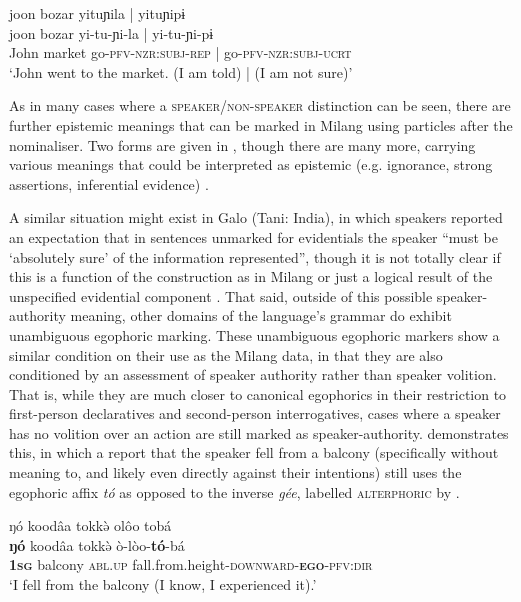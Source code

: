 \begin{exe}
        \ex \label{e:Description:MilangNonEgo}
        \glll joon bozar yituɲila | yituɲipɨ \\
        joon bozar yi-tu-ɲi-la | yi-tu-ɲi-pɨ \\
        John market go-\textsc{pfv}-\textsc{nzr:subj}-\textsc{rep} | go-\textsc{pfv}-\textsc{nzr:subj}-\textsc{ucrt} \\
        \glt `John went to the market. (I am told) | (I am not sure)' \\
        \cite[Milang,][457, given as two examples in source and combined here]{Modi2017}
\end{exe}
As in many cases where a \textsc{speaker}/\textsc{non-speaker} distinction can be seen, there are further epistemic meanings that can be marked in Milang using particles after the nominaliser. Two forms are given in , though there are many more, carrying various meanings that could be interpreted as epistemic (e.g. ignorance, strong assertions, inferential evidence) \cite[273]{Modi2017}.

A similar situation might exist in Galo (Tani: India), in which speakers reported an expectation that in sentences unmarked for evidentials the speaker ``must be `absolutely sure' of the information represented'', though it is not totally clear if this is a function of the construction as in Milang or just a logical result of the unspecified evidential component \cite[112]{Post2013}. That said, outside of this possible speaker-authority meaning, other domains of the language's grammar do exhibit unambiguous egophoric marking. These unambiguous egophoric markers show a similar condition on their use as the Milang data, in that they are also conditioned by an assessment of speaker authority rather than speaker volition. That is, while they are much closer to canonical egophorics in their restriction to first-person declaratives and second-person interrogatives, cases where a speaker has no volition over an action are still marked as speaker-authority.  demonstrates this, in which a report that the speaker fell from a balcony (specifically without meaning to, and likely even directly against their intentions) still uses the egophoric affix \textit{tó} as opposed to the inverse \textit{gée}, labelled \textsc{alterphoric} by .

\begin{exe}
        \ex \label{e:Description:GaloNonVolition}
        \glll ŋó koodâa tokkə̀ {olôo tobá} \\
        \textbf{ŋó} koodâa tokkə̀ ò-lòo-\textbf{tó}-bá \\
        \textbf{\textsc{1sg}} balcony \textsc{abl.up} fall.from.height-\textsc{downward}-\textsc{\textbf{ego}}-\textsc{pfv:dir} \\
        \glt `I fell from the balcony (I know, I experienced it).' \cite[Galo,][123, emphasis from source]{Post2013}
\end{exe}

